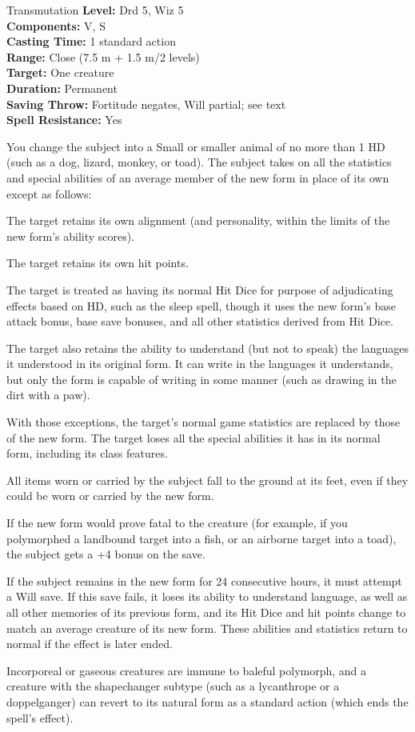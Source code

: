 {Transmutation}
{
	\textbf{Level:}
	Drd 5, Wiz 5\\
	\textbf{Components:}
	V, S\\
	\textbf{Casting Time:}
	1 standard action\\
	\textbf{Range:}
	Close (7.5 m + 1.5 m/2 levels)\\
	\textbf{Target:}
	One creature\\
	\textbf{Duration:}
	Permanent\\
	\textbf{Saving Throw:}
	Fortitude negates, Will partial; see text\\
	\textbf{Spell Resistance:}
	Yes\\
}
{
	You change the subject into a Small or smaller animal of no more than 1 HD (such as a dog, lizard, monkey, or toad). The subject takes on all the statistics and special abilities of an average member of the new form in place of its own except as follows:

\begin{itemize*}
\item The target retains its own alignment (and personality, within the limits of the new form's ability scores).
\item The target retains its own hit points.
\item The target is treated as having its normal Hit Dice for purpose of adjudicating effects based on HD, such as the sleep spell, though it uses the new form's base attack bonus, base save bonuses, and all other statistics derived from Hit Dice.
\item The target also retains the ability to understand (but not to speak) the languages it understood in its original form. It can write in the languages it understands, but only the form is capable of writing in some manner (such as drawing in the dirt with a paw).
\end{itemize*}

	With those exceptions, the target's normal game statistics are replaced by those of the new form. The target loses all the special abilities it has in its normal form, including its class features.

	All items worn or carried by the subject fall to the ground at its feet, even if they could be worn or carried by the new form.

	If the new form would prove fatal to the creature (for example, if you polymorphed a landbound target into a fish, or an airborne target into a toad), the subject gets a +4 bonus on the save.

	If the subject remains in the new form for 24 consecutive hours, it must attempt a Will save. If this save fails, it loses its ability to understand language, as well as all other memories of its previous form, and its Hit Dice and hit points change to match an average creature of its new form. These abilities and statistics return to normal if the effect is later ended.

	Incorporeal or gaseous creatures are immune to baleful polymorph, and a creature with the shapechanger subtype (such as a lycanthrope or a doppelganger) can revert to its natural form as a standard action (which ends the spell's effect).

}
